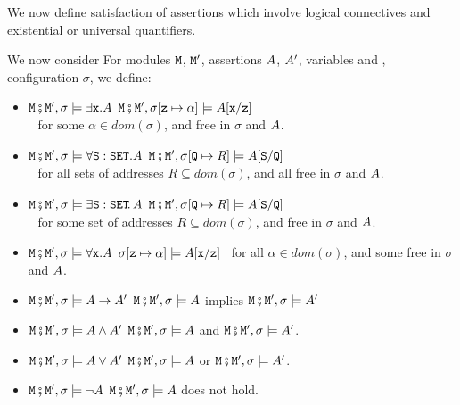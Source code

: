 We now define satisfaction of assertions which involve logical connectives and existential or universal quantifiers.

\begin{definition}  
We now consider \label{def:valid:assertion:logical}
For modules $\M$, $\M'$, assertions $\A$, $\A'$, variables  and ,  configuration $\sigma$, we define$:$
\begin{itemize}
\item
$\M\mkpair \M', \sigma \models \exists \prg{x}.\A$ \IFF
$\M\mkpair \M', \sigma[\prg{z}\mapsto \alpha] \models  \A[\prg{x}/\prg{z}]$\\
$\strut ~ $ \hfill for some  $\alpha\in dom(\sigma)$, and    free in $\sigma$ and $\A$.
\item
$\M\mkpair \M', \sigma \models \forall \prg{S}:\prg{SET}.\A$ \IFF  $\M\mkpair \M', \sigma[\prg{Q}\mapsto R] \models  \A[\prg{S}/\prg{Q}]$ \\
$\strut ~ $ \hfill for all sets of addresses $R\subseteq dom(\sigma)$, and  all  free in $\sigma$ and $\A$.
\item
$\M\mkpair \M', \sigma \models \exists \prg{S}:\prg{SET}\!.\,\A$ \IFF  $\M\mkpair \M', \sigma[\prg{Q}\mapsto R] \models  \A[\prg{S}/\prg{Q}]$ \\
 $\strut ~ $ \hfill  for some set of addresses $R\subseteq dom(\sigma)$, and    free in $\sigma$ and $\A$.
\item
$\M\mkpair \M', \sigma \models \forall \prg{x}.\A$ \IFF
$\sigma[\prg{z}\mapsto \alpha] \models  \A[\prg{x}/\prg{z}]$ \ for all  $\alpha\in dom(\sigma)$, and  some  free in $\sigma$ and $\A$.
\item
$\M\mkpair \M', \sigma \models \A \rightarrow \A' $ \IFF  $\M\mkpair \M', \sigma \models \A $ implies $\M\mkpair \M', \sigma \models \A' $
\item
$\M\mkpair \M', \sigma \models  \A \wedge \A'$   \IFF  $\M\mkpair \M', \sigma \models  \A $
and $\M\mkpair \M', \sigma \models  \A'$.
\item
$\M\mkpair \M', \sigma \models  \A \vee \A'$   \IFF  $\M\mkpair \M', \sigma \models  \A $
or $\M\mkpair \M', \sigma \models  \A'$.
\item
$\M\mkpair \M', \sigma \models  \neg\A$   \IFF  $\M\mkpair \M', \sigma \models  \A $
does not hold.
\end{itemize}
\end{definition}

